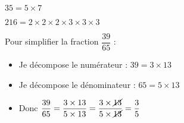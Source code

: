 \documentclass[../Cours.tex]{subfiles}
\begin{document}
\begin{listedexemples}
    \item $35 = 5 \times 7$
    \item $216 = 2 \times 2 \times 2 \times 3 \times 3 \times 3 $
\end{listedexemples}



\renewcommand{\CancelColor}{\color{rouge}}
\renewcommand{\labelitemii}{$\blacksquare$}
\begin{listedexemples}
\item Pour simplifier la fraction $\dfrac{39}{65}$ :
\begin{itemize}
\item Je décompose le numérateur : $39=3 \times 13$
\item Je décompose le dénominateur : $65=5 \times 13$
\item Donc $\dfrac{39}{65} = \dfrac{3 \times 13}{5 \times 13} = \dfrac{3 \times \cancel{13}}{5 \times \cancel{13}} = \dfrac{3}{5}$
\end{itemize}
\end{listedexemples}

\clearpage
\end{document}
